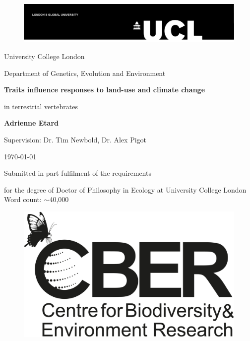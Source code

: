 \date{\today}

\begin{titlepage}

\begin{figure}
{\includegraphics[scale=0.8]{UCL_logo}}
\end{figure}

\begin{center}

{\Large
University College London\par
Department of Genetics, Evolution and Environment\par
}
%
\vskip 3.5cm
%
{\huge \bf
Traits influence responses to land-use and climate change\par in terrestrial vertebrates\par
}
%
\vskip 2cm
%
{\Large
\textbf{Adrienne Etard}\par
\vskip 1cm
Supervision: Dr. Tim Newbold, Dr. Alex Pigot

\vskip 1cm

\makeatletter
\today
\vskip 0.5cm
\par
Submitted in part fulfilment of the requirements \par 
for the degree of Doctor of Philosophy in Ecology at University College London
\vskip 0.5cm
 Word count: $\sim$40,000
\vskip 1cm
}
\end{center}
\begin{figure}[h!]
\centering
{\includegraphics[scale=0.09]{cber_logo}}
\end{figure}
\end{titlepage}

\makeatother